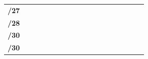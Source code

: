 \documentclass[11pt,a4paper]{report}
\begin{document}
\begin{table}[]
\begin{center}
\begin{tabular}{rlcccccccccccccccc}
\textbf{/27}                                                                                             &                       &                           &                           &                           &                           &                           &                            &                            &                            &                                 &                                 & \cellcolor[HTML]{FFD966}        & \cellcolor[HTML]{FFD966}        &                                 &                                 &                                  &                                 \\ \cline{3-18} 
\textbf{/28}                                                                                             &                       &                           &                           &                           &                           &                           &                            &                            &                            & \cellcolor[HTML]{BFBFBF}        & \cellcolor[HTML]{BFBFBF}        &                                 &                                 &                                 &                                 &                                  &                                 \\ \cline{3-18} 
\textbf{/30}                                                                                             &                       &                           &                           &                           &                           &                           &                            & \cellcolor[HTML]{C09FE5}   & \cellcolor[HTML]{C09FE5}   &                                 &                                 &                                 &                                 &                                 &                                 &                                  &                                 \\ \cline{3-18} 
\textbf{/30}                                                                                             &                       &                           &                           &                           &                           & \cellcolor[HTML]{C09FE5}  & \cellcolor[HTML]{C09FE5}   &                            &                            &                                 &                                 &                                 &                                 &                                 &                                 &                                  &                                 \\ \cline{3-18} 

\end{tabular}
\end{center}
\end{table}
\end{document}
